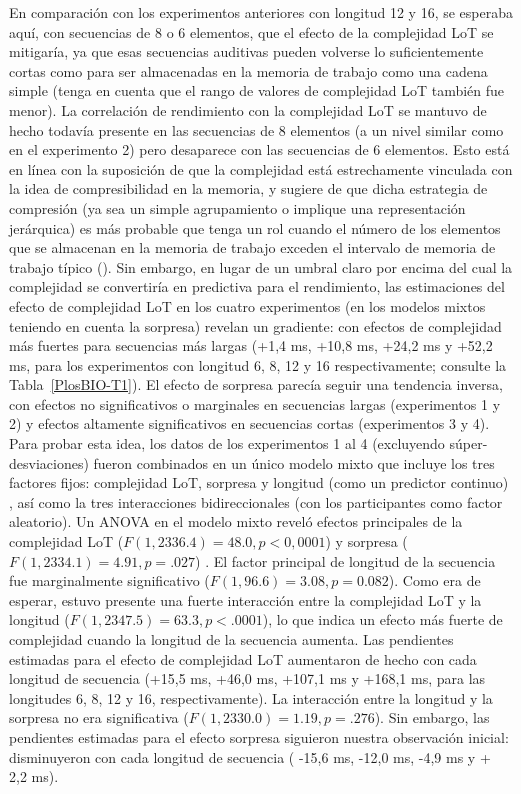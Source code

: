 En comparación con los experimentos anteriores con longitud 12 y 16, se esperaba aquí, con secuencias de 8 o 6 elementos, que el efecto de la complejidad LoT se mitigaría, ya que esas secuencias auditivas pueden volverse lo suficientemente cortas como para ser almacenadas en la memoria de trabajo como una cadena simple (tenga en cuenta que el rango de valores de complejidad LoT también fue menor). La correlación de rendimiento con la complejidad LoT se mantuvo de hecho todavía presente en las secuencias de 8 elementos (a un nivel similar como en el experimento 2) pero desaparece con las secuencias de 6 elementos. Esto está en línea con la suposición de que la complejidad está estrechamente vinculada con la idea de compresibilidad en la memoria, y sugiere de que dicha estrategia de compresión (ya sea un simple agrupamiento o implique una representación jerárquica) es más probable que tenga un rol cuando el número de los elementos que se almacenan en la memoria de trabajo exceden el intervalo de memoria de trabajo típico (\cite{f16,f89}). Sin embargo, en lugar de un umbral claro por encima del cual la complejidad se convertiría en predictiva para el rendimiento, las estimaciones del efecto de complejidad LoT en los cuatro experimentos (en los modelos mixtos teniendo en cuenta la sorpresa) revelan un gradiente: con efectos de complejidad más fuertes para secuencias más largas (+1,4 ms, +10,8 ms, +24,2 ms y +52,2 ms, para los experimentos con longitud 6, 8, 12 y 16 respectivamente; consulte la Tabla~\ref{PlosBIO-T1}). El efecto de sorpresa parecía seguir una tendencia inversa, con efectos no significativos o marginales en secuencias largas (experimentos 1 y 2) y efectos altamente significativos en secuencias cortas (experimentos 3 y 4). Para probar esta idea, los datos de los experimentos 1 al 4 (excluyendo súper-desviaciones) fueron combinados en un único modelo mixto que incluye los tres factores fijos: complejidad LoT, sorpresa y longitud (como un predictor continuo) , así como la tres interacciones bidireccionales (con los participantes como factor aleatorio). Un ANOVA en el modelo mixto reveló efectos principales de la complejidad LoT ($F (1 , 2336.4) = 48.0 , p <0,0001$) y sorpresa ( $F (1 , 2334.1 ) = 4.91 , p =.027$) . El factor principal de longitud de la secuencia fue marginalmente significativo ($F (1, 96.6 ) = 3.08 , p = 0.082$). Como era de esperar, estuvo presente una fuerte interacción entre la complejidad LoT y la longitud ($F (1 , 2347.5 ) = 63.3 , p <.0001$), lo que indica un efecto más fuerte de complejidad cuando la longitud de la secuencia aumenta. Las pendientes estimadas para el efecto de complejidad LoT aumentaron de hecho con cada longitud de secuencia (+15,5 ms, +46,0 ms, +107,1 ms y +168,1 ms, para las longitudes 6, 8, 12 y 16, respectivamente). La interacción entre la longitud y la sorpresa no era significativa ($F (1, 2330.0 ) = 1.19 , p = . 276$). Sin embargo, las pendientes estimadas para el efecto sorpresa siguieron nuestra observación inicial: disminuyeron con cada longitud de secuencia ( -15,6 ms, -12,0 ms, -4,9 ms y + 2,2 ms).


